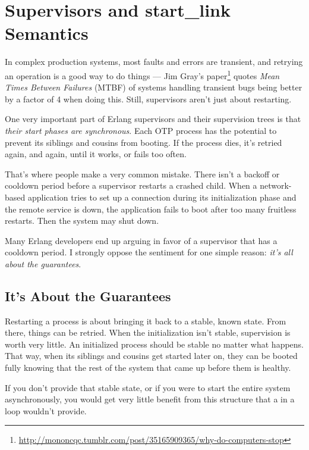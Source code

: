 \section{Supervisors and start\_link Semantics}
\label{sec:supervisors-and-start-link-semantics}

In complex production systems, most faults and errors are transient, and retrying an operation is a good way to do things — Jim Gray's paper\footnote{\href{http://mononcqc.tumblr.com/post/35165909365/why-do-computers-stop}{http://mononcqc.tumblr.com/post/35165909365/why-do-computers-stop}} quotes \emph{Mean Times Between Failures} (MTBF) of systems handling transient bugs being better by a factor of 4 when doing this. Still, supervisors aren't just about restarting.

One very important part of Erlang supervisors and their supervision trees is that \emph{their start phases are synchronous}. Each OTP process has the potential to prevent its siblings and cousins from booting. If the process dies, it's retried again, and again, until it works, or fails too often.

That's where people make a very common mistake. There isn't a backoff or cooldown period before a supervisor restarts a crashed child. When a network-based application tries to set up a connection during its initialization phase and the remote service is down, the application fails to boot after too many fruitless restarts. Then the system may shut down.

Many Erlang developers end up arguing in favor of a supervisor that has a cooldown period. I strongly oppose the sentiment for one simple reason: \emph{it's all about the guarantees}.

\subsection{It's About the Guarantees}
\label{subsec:start-link-guarantees}

Restarting a process is about bringing it back to a stable, known state. From there, things can be retried. When the initialization isn't stable, supervision is worth very little. An initialized process should be stable no matter what happens. That way, when its siblings and cousins get started later on, they can be booted fully knowing that the rest of the system that came up before them is healthy.

If you don't provide that stable state, or if you were to start the entire system asynchronously, you would get very little benefit from this structure that a  in a loop wouldn't provide.

